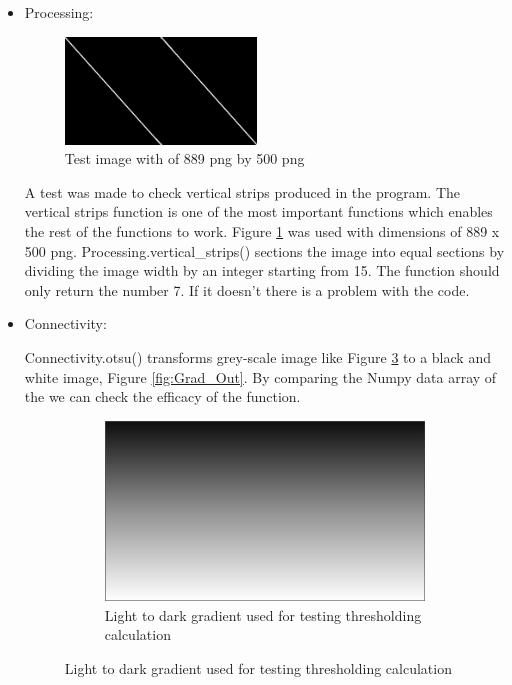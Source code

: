 \begin{itemize}


\item Processing: 
 
            \begin{figure}[h] 
            \centering
            \includegraphics[width=2in]{Figures/testing/45Degrees.png}
            \caption{Test image with of 889 png by 500 png}
            \label{fig:processing_vertical_strips}
            \end{figure}   


    A test was made to check vertical strips produced in the program. The vertical strips function is one of the most important functions which enables the rest of the functions to work.
    Figure \ref{fig:processing_vertical_strips} was used with dimensions of 889 x 500 png. Processing.vertical\_strips() sections the image into equal sections by dividing the image width by an integer starting from 15. The function should only return the number 7. If it doesn't there is a problem with the code. 
    \item Connectivity:
    
    Connectivity.otsu() transforms grey-scale image like Figure \ref{fig:gradient_in} to a black and white image, Figure \ref{fig:Grad_Out}. By comparing the Numpy data array of the we can check the efficacy of the function.
    
    
    \noindent
        \begin{figure}
             \centering
             \begin{subfigure}[b]{0.3\textwidth}
                 \centering
                 \includegraphics[width=\textwidth]{Figures/testing/Gradient.png}
                 \caption{Light to dark gradient used for testing thresholding calculation}
                 \label{fig:gradient_in}
             \end{subfigure}
             

\end{figure}
\end{itemize}
